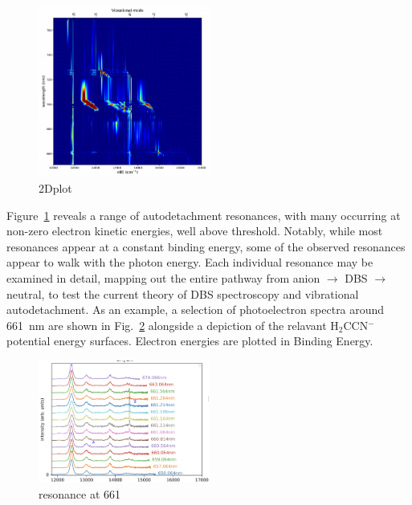 \documentclass[journal=jpcafh,manuscript=article,layout=onecolumn, 12pt]{achemso}
\begin{document}
\begin{figure}
	\includegraphics[width=0.5\textwidth]{scripts/screen2D}
	\caption{2Dplot}
	\label{fig:PESall}
\end{figure}

Figure~\ref{fig:PESall} reveals a range of autodetachment resonances, with many occurring at non-zero electron kinetic energies, well above threshold. Notably, while most resonances appear at a constant binding energy, some of the observed resonances appear to walk with the photon energy. Each individual resonance may be examined in detail, mapping out the entire pathway from anion $\rightarrow$ DBS $\rightarrow$ neutral, to test the current theory of DBS spectroscopy and vibrational autodetachment. As an example, a selection of photoelectron spectra around 661~nm are shown in Fig.~\ref{fig:661} alongside a depiction of the relavant H$_2$CCN$^-$ potential energy surfaces. Electron energies are plotted in Binding Energy.

\begin{figure}
	\includegraphics[width=0.5\textwidth]{scripts/661}
	\caption{resonance at 661}
	\label{fig:661}
\end{figure}
\end{document}

